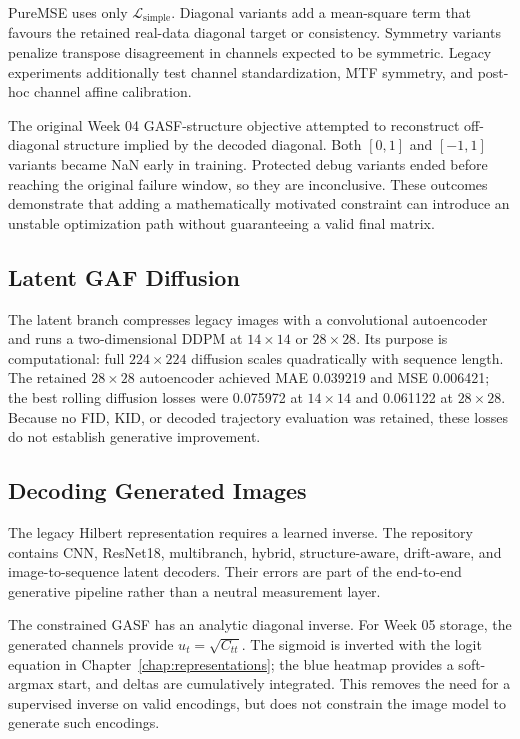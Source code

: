 \documentclass[12pt,a4paper,oneside]{report}
\begin{document}
PureMSE uses only $\mathcal{L}_{\mathrm{simple}}$. Diagonal variants add a mean-square term that favours the retained real-data diagonal target or consistency. Symmetry variants penalize transpose disagreement in channels expected to be symmetric. Legacy experiments additionally test channel standardization, MTF symmetry, and post-hoc channel affine calibration.

The original Week 04 GASF-structure objective attempted to reconstruct off-diagonal structure implied by the decoded diagonal. Both $[0,1]$ and $[-1,1]$ variants became NaN early in training. Protected debug variants ended before reaching the original failure window, so they are inconclusive. These outcomes demonstrate that adding a mathematically motivated constraint can introduce an unstable optimization path without guaranteeing a valid final matrix.

\subsection{Latent GAF Diffusion}

The latent branch compresses legacy images with a convolutional autoencoder and runs a two-dimensional DDPM at $14\times14$ or $28\times28$. Its purpose is computational: full $224\times224$ diffusion scales quadratically with sequence length. The retained $28\times28$ autoencoder achieved MAE 0.039219 and MSE 0.006421; the best rolling diffusion losses were 0.075972 at $14\times14$ and 0.061122 at $28\times28$. Because no FID, KID, or decoded trajectory evaluation was retained, these losses do not establish generative improvement.

\subsection{Decoding Generated Images}

The legacy Hilbert representation requires a learned inverse. The repository contains CNN, ResNet18, multibranch, hybrid, structure-aware, drift-aware, and image-to-sequence latent decoders. Their errors are part of the end-to-end generative pipeline rather than a neutral measurement layer.

The constrained GASF has an analytic diagonal inverse. For Week 05 storage, the generated channels provide $u_t=\sqrt{C_{tt}}$. The sigmoid is inverted with the logit equation in Chapter~\ref{chap:representations}; the blue heatmap provides a soft-argmax start, and deltas are cumulatively integrated. This removes the need for a supervised inverse on valid encodings, but does not constrain the image model to generate such encodings.
\end{document}
